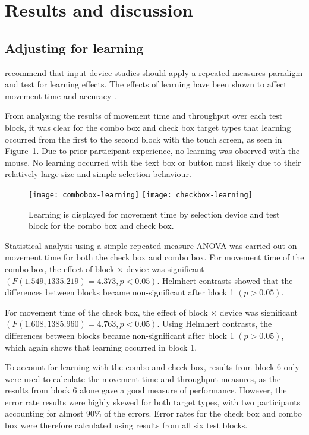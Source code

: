 \documentclass{elsart}
\begin{document}
\section{Results and discussion}
\label{sec-results}


\subsection{Adjusting for learning}
\label{sec-results-learning}

\citet{Doug-SA-1999-CHI} recommend that input device studies should
apply a repeated measures paradigm and test for learning effects. The
effects of learning have been shown to affect movement time and accuracy
\citep{Doug-SA-1999-CHI}.

From analysing the results of movement time and throughput over each
test block, it was clear for the combo box and check box target types
that learning occurred from the first to the second block with the touch
screen, as seen in Figure~\ref{fig-movement-time-learning}. Due to prior
participant experience, no learning was observed with the mouse. No
learning occurred with the text box or button most likely due to their
relatively large size and simple selection behaviour.


\begin{figure}
	\centering
	\texttt{[image: combobox-learning]}
	\texttt{[image: checkbox-learning]}
	\caption{Learning is displayed for movement time by selection device
	and test block for the combo box and check box.}
	\label{fig-movement-time-learning}
\end{figure}


Statistical analysis using a simple repeated measure ANOVA was carried
out on movement time for both the check box and combo box. For movement
time of the combo box, the effect of block \(\times\) device was
significant \((F(1.549, 1335.219) = 4.373, p < 0.05)\). Helmhert
contrasts showed that the differences between blocks became
non-significant after block 1 \((p > 0.05)\).

For movement time of the check box, the effect of block \(\times\)
device was significant \((F(1.608, 1385.960) = 4.763, p < 0.05)\). Using
Helmhert contrasts, the differences between blocks became
non-significant after block 1 \((p > 0.05)\), which again shows that
learning occurred in block 1.

To account for learning with the combo and check box, results from block
6 only were used to calculate the movement time and throughput measures,
as the results from block 6 alone gave a good measure of performance.
However, the error rate results were highly skewed for both target
types, with two participants accounting for almost 90\% of the errors.
Error rates for the check box and combo box were therefore calculated
using results from all six test blocks.
\end{document}
